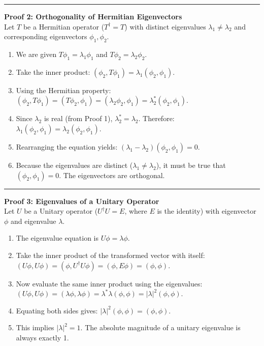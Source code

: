 \documentclass[11pt, a4paper]{report}
\begin{document}
\vspace{1em}
\hrule
\vspace{1em}

\textbf{Proof 2: Orthogonality of Hermitian Eigenvectors}\\
Let $T$ be a Hermitian operator ($T^\dagger = T$) with distinct eigenvalues $\lambda_1 \neq \lambda_2$ and corresponding eigenvectors $\phi_1, \phi_2$.
\begin{enumerate}
    \item We are given $T\phi_1 = \lambda_1\phi_1$ and $T\phi_2 = \lambda_2\phi_2$.
    \item Take the inner product: $(\phi_2, T\phi_1) = \lambda_1(\phi_2, \phi_1)$.
    \item Using the Hermitian property: $(\phi_2, T\phi_1) = (T\phi_2, \phi_1) = (\lambda_2\phi_2, \phi_1) = \lambda_2^*(\phi_2, \phi_1)$.
    \item Since $\lambda_2$ is real (from Proof 1), $\lambda_2^* = \lambda_2$. Therefore: $\lambda_1(\phi_2, \phi_1) = \lambda_2(\phi_2, \phi_1)$.
    \item Rearranging the equation yields: $(\lambda_1 - \lambda_2)(\phi_2, \phi_1) = 0$. 
    \item Because the eigenvalues are distinct ($\lambda_1 \neq \lambda_2$), it must be true that $(\phi_2, \phi_1) = 0$. The eigenvectors are orthogonal.
\end{enumerate}

\vspace{1em}
\hrule
\vspace{1em}

\textbf{Proof 3: Eigenvalues of a Unitary Operator}\\
Let $U$ be a Unitary operator ($U^\dagger U = E$, where $E$ is the identity) with eigenvector $\phi$ and eigenvalue $\lambda$.
\begin{enumerate}
    \item The eigenvalue equation is $U\phi = \lambda\phi$.
    \item Take the inner product of the transformed vector with itself: $(U\phi, U\phi) = (\phi, U^\dagger U \phi) = (\phi, E\phi) = (\phi, \phi)$.
    \item Now evaluate the same inner product using the eigenvalues: $(U\phi, U\phi) = (\lambda\phi, \lambda\phi) = \lambda^*\lambda(\phi, \phi) = |\lambda|^2(\phi, \phi)$.
    \item Equating both sides gives: $|\lambda|^2(\phi, \phi) = (\phi, \phi)$.
    \item This implies $|\lambda|^2 = 1$. The absolute magnitude of a unitary eigenvalue is always exactly 1.
\end{enumerate}
\end{document}
